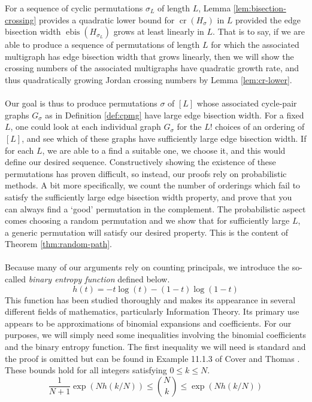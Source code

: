 \documentclass[11pt,a4paper]{amsart}
\theoremstyle{definition}
\theoremstyle{remark}
\DeclareMathOperator{\crn}{cr}
\DeclareMathOperator{\bis}{ebis}
\begin{document}
For a sequence of cyclic permutations $\sigma_{L}$ of length $L$, Lemma \ref{lem:bisection-crossing} provides a quadratic lower bound for $\crn(H_{\sigma})$ in $L$ provided the edge bisection width $\bis(H_{\sigma_{L}})$ grows at least linearly in $L$.  That is to say, if we are able to produce a sequence of permutations of length $L$ for which the associated multigraph has edge bisection width that grows linearly, then we will show the crossing numbers of the associated multigraphs have quadratic growth rate, and thus quadratically growing Jordan crossing numbers by Lemma \ref{lem:cr-lower}.  \\
\\
Our goal is thus to produce permutations $\sigma$ of $[L]$ whose associated cycle-pair graphs $G_{\sigma}$ as in Definition \ref{def:cpmg} have large edge bisection width.  For a fixed $L$, one could look at each individual graph $G_{\sigma}$ for the $L!$ choices of an ordering of $[L]$, and see which of these graphs have sufficiently large edge bisection width.  If for each $L$, we are able to a find a suitable one, we choose it, and this would define our desired sequence.  Constructively showing the existence of these permutations has proven difficult, so instead, our proofs rely on probabilistic methods.  A bit more specifically, we count the number of orderings which fail to satisfy the sufficiently large edge bisection width property, and prove that you can always find a `good' permutation in the complement.  The probabilistic aspect comes choosing a random permutation and we show that for sufficiently large $L$, a generic permutation will satisfy our desired property.  This is the content of Theorem \ref{thm:random-path}.  
\\
\\
Because many of our arguments rely on counting principals, we introduce the so-called \emph{binary entropy function} defined below.
\begin{equation}\label{eq:binent}
h(t) = -t\log(t) - (1-t)\log(1-t) 
\end{equation}
This function has been studied thoroughly and makes its appearance in several different fields of mathematics, particularly Information Theory.  Its primary use appears to be approximations of binomial expansions and coefficients.  For our purposes, we will simply need some inequalities involving the binomial coefficients and the binary entropy function.  The first inequality we will need is standard and the proof is omitted but can be found in Example 11.1.3 of Cover and Thomas \cite{cover2006elements}.  These bounds hold for all integers satisfying $0 \leq k \leq N$.  
\begin{equation}\label{eq:binest}
\frac{1}{N+1}\exp\left(Nh(k/N)\right) \leq \binom{N}{k} \leq \exp\left(Nh(k/N)\right)
\end{equation}
\end{document}

